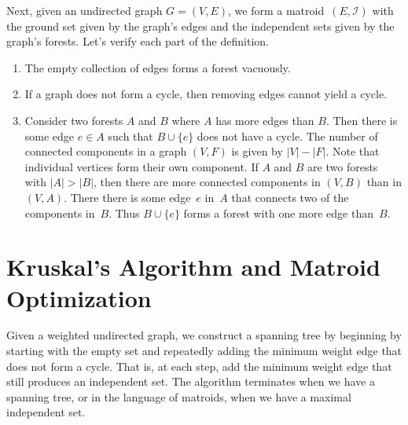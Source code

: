 \documentclass[twoside]{article}
\newcommand{\I}{\mathcal{I}}
\begin{document}
Next, given an undirected graph ${G = (V, E)}$, we form a matroid~$(E, \I)$ with the ground set given by the graph's edges and the independent sets given by the graph's forests.
Let's verify each part of the definition.
\begin{enumerate}
  \item The empty collection of edges forms a forest vacuously.
  \item If a graph does not form a cycle, then removing edges cannot yield a cycle.
  \item Consider two forests $A$ and $B$ where $A$ has more edges than $B$.
    Then there is some edge ${e \in A}$ such that ${B \cup \{e\}}$ does not have a cycle.
    The number of connected components in a graph ${(V, F)}$ is given by ${|V| - |F|}$.
    Note that individual vertices form their own component.
    If $A$ and $B$ are two forests with ${|A| > |B|}$, then there are more connected components in ${(V, B)}$ than in ${(V, A)}$.
    There there is some edge~$e$ in~$A$ that connects two of the components in~$B$.
    Thus ${B \cup \{e\}}$ forms a forest with one more edge than~$B$.
\end{enumerate}

\section{Kruskal's Algorithm and Matroid Optimization}

Given a weighted undirected graph, we construct a spanning tree by beginning by starting with the empty set and repeatedly adding the minimum weight edge that does not form a cycle.
That is, at each step, add the minimum weight edge that still produces an independent set.
The algorithm terminates when we have a spanning tree, or in the language of matroids, when we have a maximal independent set.
\end{document}
